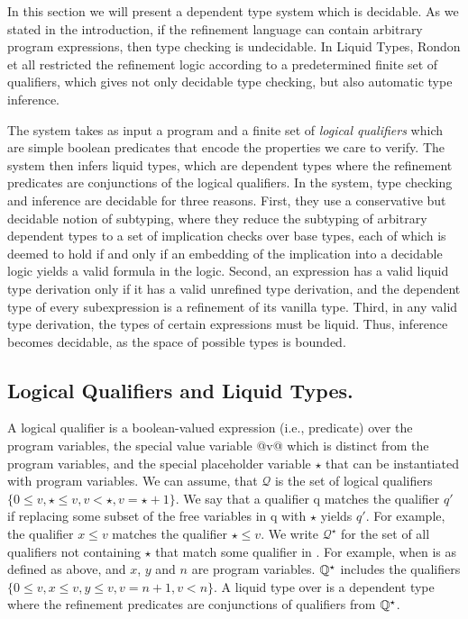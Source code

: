 In this section we will present a dependent type system which is decidable.
As we stated in the introduction, if the refinement language can contain arbitrary 
program expressions, then type checking is undecidable.
%
In Liquid Types\cite{LiquidPLDI08},  Rondon et all restricted the refinement logic according to a predetermined 
finite set of qualifiers,  which gives not only decidable type checking, but also automatic
type inference.



The system takes as input a program and 
a finite set of \textit{logical qualifiers}
which are simple boolean predicates 
that encode the properties we care to verify. 
The system then infers
liquid types, which are dependent types where the refinement predicates are conjunctions of the logical qualifiers.
In the system, type checking and inference are decidable for
three reasons. 
%
First, they use a conservative but decidable
notion of subtyping, where they reduce the subtyping of arbitrary
dependent types to a set of implication checks over base types,
each of which is deemed to hold if and only if an embedding of
the implication into a decidable logic yields a valid formula in
the logic. 
%
Second, an expression has a valid liquid type derivation
only if it has a valid unrefined type derivation, and the dependent 
type of every subexpression is a refinement of its vanilla type. 
%
Third, in any valid type derivation, the types of certain expressions
must be liquid. Thus, inference becomes decidable, as the space of
possible types is bounded. 


\subsection{Logical Qualifiers and Liquid Types.}

A logical qualifier is a
boolean-valued expression (i.e., predicate) over the program variables, 
the special value variable @v@ which is distinct from the
program variables, and the special placeholder variable $\star$ that
can be instantiated with program variables. 
We can assume, that $\mathcal{Q}$ is the set of logical qualifiers
$\{0 \leq v, \star \leq v, v < \star,  v = \star + 1\}$. 
%
We say that
a qualifier q matches the qualifier $q'$
if replacing some subset of
the free variables in q with $\star$ yields $q'$.
For example, the qualifier
$x \leq v$ matches the qualifier $\star \leq v$. 
We write $\mathcal{Q}^\star$
for the set of all
qualifiers not containing $\star$ that match some qualifier in \qset. 
For example, when \qset is as defined as above, 
and $x$, $y$ and $n$ are program variables.
$\mathbb{Q}^\star$
includes the qualifiers
$\{0 \leq v, x \leq v, y \leq v, v = n + 1, v <n\}$. 
A liquid type over \qset is a dependent type where the refinement predicates are
conjunctions of qualifiers from $\mathbb{Q} ^ \star$.

